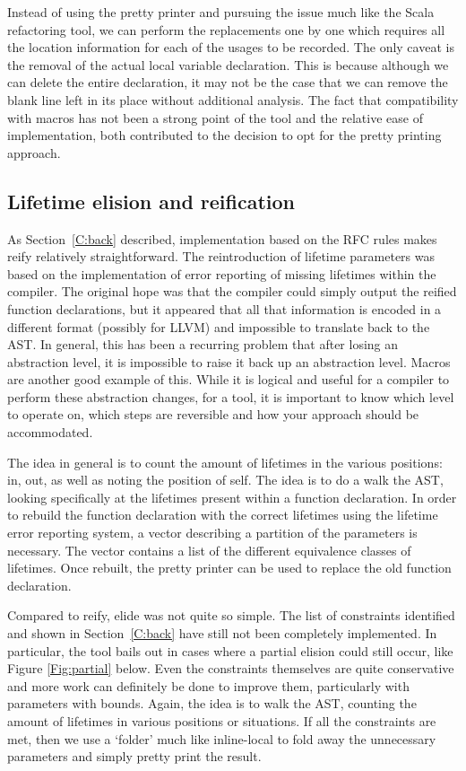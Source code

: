 Instead of using the pretty printer and pursuing the issue much like the Scala refactoring tool, we can perform the replacements one by one which requires all the location information for each of the usages to be recorded. The only caveat is the removal of the actual local variable declaration. This is because although we can delete the entire declaration, it may not be the case that we can remove the blank line left in its place without additional analysis. The fact that compatibility with macros has not been a strong point of the tool and the relative ease of implementation, both contributed to the decision to opt for the pretty printing approach.

\subsection{Lifetime elision and reification}

As Section~\ref{C:back} described, implementation based on the RFC rules makes reify relatively straightforward. The reintroduction of lifetime parameters was based on the implementation of error reporting of missing lifetimes within the compiler. The original hope was that the compiler could simply output the reified function declarations, but it appeared that all that information is encoded in a different format (possibly for LLVM) and impossible to translate back to the AST. In general, this has been a recurring problem that after losing an abstraction level, it is impossible to raise it back up an abstraction level. Macros are another good example of this. While it is logical and useful for a compiler to perform these abstraction changes, for a tool, it is important to know which level to operate on, which steps are reversible and how your approach should be accommodated.

The idea in general is to count the amount of lifetimes in the various positions: in, out, as well as noting the position of self. The idea is to do a walk the AST, looking specifically at the lifetimes present within a function declaration. In order to rebuild the function declaration with the correct lifetimes using the lifetime error reporting system, a vector describing a partition of the parameters is necessary. The vector contains a list of the different equivalence classes of lifetimes. Once rebuilt, the pretty printer can be used to replace the old function declaration.

Compared to reify, elide was not quite so simple. The list of constraints identified and shown in Section~\ref{C:back} have still not been completely implemented. In particular, the tool bails out in cases where a partial elision could still occur, like Figure \ref{Fig:partial} below. Even the constraints themselves are quite conservative and more work can definitely be done to improve them, particularly with parameters with bounds. Again, the idea is to walk the AST, counting the amount of lifetimes in various positions or situations. If all the constraints are met, then we use a `folder' much like inline-local to fold away the unnecessary parameters and simply pretty print the result.

